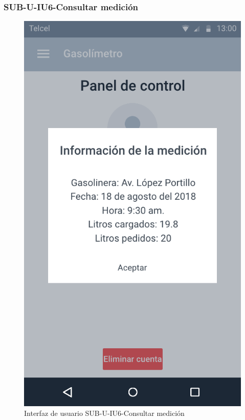\subsubsection{SUB-U-IU6-Consultar medición}\label{SUB-C-IU6}
\begin{figure}[H]
	\centering
	\includegraphics[scale=.55]{Capitulo4/software/submodulos/usuarios/images/sub-u-iu6}
	\caption{Interfaz de usuario SUB-U-IU6-Consultar medición}
	\label{fig:sub-u-iu6}
\end{figure}